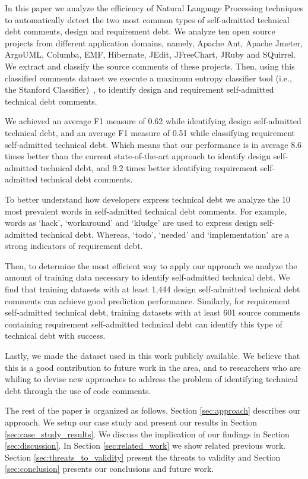 \documentclass{sig-alternate}
\newcommand{\SATD}{self-admitted technical debt\xspace}
\begin{document}
In this paper we analyze the efficiency of Natural Language Processing techniques to automatically detect the two most common types of \SATD comments, design and requirement debt. We analyze ten open source projects from different application domains, namely, Apache Ant, Apache Jmeter, ArgoUML, Columba, EMF, Hibernate, JEdit, JFreeChart, JRuby and SQuirrel. We extract and classify the source comments of these projects. Then, using this classified comments dataset we execute a maximum entropy classifier tool (i.e., the Stanford Classifier)~\cite{Manning2014ACL}, to identify design and requirement \SATD comments.

We achieved an average F1 measure of 0.62 while identifying design \SATD, and an average F1 measure of 0.51 while classifying requirement \SATD. Which means that our performance is in average 8.6 times better than the current state-of-the-art approach to identify design \SATD, and 9.2 times better identifying requirement \SATD comments.

To better understand how developers express technical debt we analyze the 10 most prevalent words in \SATD comments. For example, words as `hack', `workaround' and `kludge' are used to express design \SATD. Whereas, `todo', `needed' and `implementation' are a strong indicators of requirement debt.

Then, to determine the most efficient way to apply our approach we analyze the amount of training data necessary to identify \SATD. We find that training datasets with at least 1,444 design \SATD comments can achieve good prediction performance. Similarly, for requirement \SATD, training datasets with at least 601 source comments containing requirement \SATD can identify this type of technical debt with success.  

Lastly, we made the dataset used in this work publicly available. We believe that this is a good contribution to future work in the area, and to researchers who are whiling to devise new approaches to address the problem of identifying technical debt through the use of code comments.

The rest of the paper is organized as follows. Section \ref{sec:approach} describes our approach. We setup our case study and present our
results in Section \ref{sec:case_study_results}. We discuss the implication of our findings in Section \ref{sec:discussion}. In Section \ref{sec:related_work} we show related previous work. Section \ref{sec:threats_to_validity} present the threats to validity and Section \ref{sec:conclusion} presents our conclusions and future work.  
\end{document}
